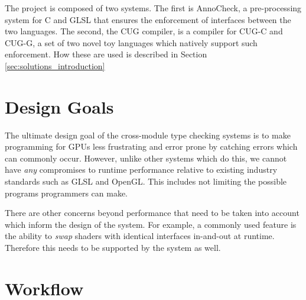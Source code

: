 \documentclass[a4paper,12pt,twoside,openright]{report}
\begin{document}
The project is composed of two systems. The first is AnnoCheck, a
pre-processing system for C and GLSL that ensures the enforcement of interfaces
between the two languages. The second, the CUG compiler, is a compiler for
CUG-C and CUG-G, a set of two novel toy languages which natively support
such enforcement. How these are used is described in Section
\ref{sec:solutions_introduction}

\section{Design Goals}

The ultimate design goal of the cross-module type checking systems is to make
programming for GPUs less frustrating and error prone by catching errors which
can commonly occur. However, unlike other systems which do this, we cannot have
\textit{any} compromises to runtime performance relative to existing industry
standards such as GLSL and OpenGL. This includes not limiting the possible
programs programmers can make.


There are other concerns beyond performance that need to be taken into account
which inform the design of the system. For example, a commonly used feature is
the ability to \textit{swap} shaders with identical interfaces in-and-out at
runtime. Therefore this needs to be supported by the system as well.








\section{Workflow}
\end{document}

